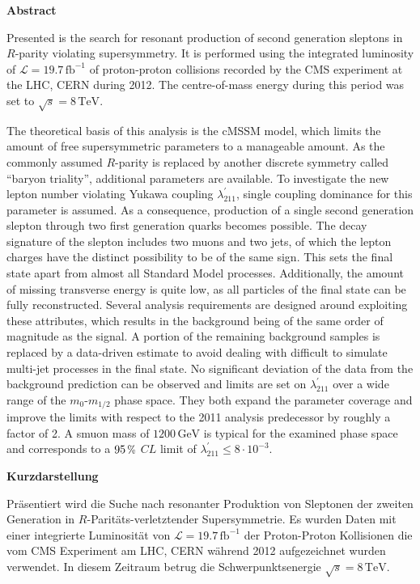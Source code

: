 \documentclass[11pt,a4paper,twoside,openright,DIV=13,BCOR=1cm]{scrbook} %
\numberwithin{equation}{chapter} %
\numberwithin{figure}{chapter} %
\numberwithin{table}{chapter} %
\newcommand{\pct}{\scalebox{.9}{\%}}
\begin{document}

\newpage

\begin{center} \textbf{Abstract} \end{center}
\noindent Presented is the search for resonant production of second generation sleptons in $R$-parity violating supersymmetry. It is performed using the integrated luminosity of $\mathcal{L} = 19.7\,\text{fb}^{-1}$ of proton-proton collisions recorded by the CMS experiment at the LHC, CERN during 2012. The centre-of-mass energy during this period was set to $\sqrt{s} = 8\,\text{TeV}$.

The theoretical basis of this analysis is the cMSSM model, which limits the amount of free supersymmetric parameters to a manageable amount. As the commonly assumed $R$-parity is replaced by another discrete symmetry called ``baryon triality'', additional parameters are available. To investigate the new lepton number violating Yukawa coupling $\lambda^\prime_{211}$, single coupling dominance for this parameter is assumed. As a consequence, production of a single second generation slepton through two first generation quarks becomes possible. The decay signature of the slepton includes two muons and two jets, of which the lepton charges have the distinct possibility to be of the same sign. This sets the final state apart from almost all Standard Model processes. Additionally, the amount of missing transverse energy is quite low, as all particles of the final state can be fully reconstructed. Several analysis requirements are designed around exploiting these attributes, which results in the background being of the same order of magnitude as the signal. A portion of the remaining background samples is replaced by a data-driven estimate to avoid dealing with difficult to simulate multi-jet processes in the final state. No significant deviation of the data from the background prediction can be observed and limits are set on $\lambda^\prime_{211}$ over a wide range of the $m_0$-$m_{1/2}$ phase space. They both expand the parameter coverage and improve the limits with respect to the 2011 analysis predecessor  by roughly a factor of 2. A smuon mass of $1200\,\text{GeV}$ is typical for the examined phase space and corresponds to a $95\,\pct$ $CL$ limit of $\lambda^\prime_{211} \leq 8 \cdot 10^{-3}$.


\newpage
\begin{center} \textbf{Kurzdarstellung} \end{center}
\noindent Präsentiert wird die Suche nach resonanter Produktion von Sleptonen der zweiten Generation in $R$-Paritäts-verletztender Supersymmetrie. Es wurden Daten mit einer integrierte Luminosität von $\mathcal{L} = 19.7\,\text{fb}^{-1}$ der Proton-Proton Kollisionen die vom CMS Experiment am LHC, CERN während 2012 aufgezeichnet wurden verwendet. In diesem Zeitraum betrug die Schwerpunktsenergie $\sqrt{s} = 8\,\text{TeV}$.
\end{document}
